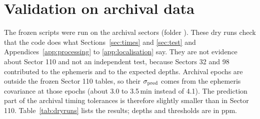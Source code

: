 \section{Validation on archival data} \label{app:validation}

The frozen scripts were run on the archival sectors (folder ). These dry runs check that the code does
what Sections~\ref{sec:times} and \ref{sec:test} and Appendices~\ref{app:processing} to \ref{app:localisation}
say. They are not evidence about Sector 110 and not an
independent test, because Sectors 32 and 98 contributed to the ephemeris and to the expected depths. Archival epochs
are outside the frozen Sector 110 tables, so their $\sigma_{\rm pred}$ comes from the ephemeris covariance at those
epochs (about 3.0 to 3.5\,min instead of 4.1). The prediction part of the archival timing tolerances is therefore slightly smaller than in
Sector 110. Table~\ref{tab:dryruns} lists the results; depths and thresholds are in ppm.

